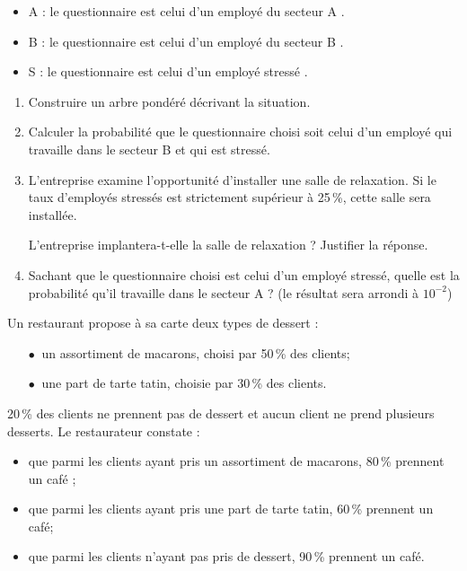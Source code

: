 \documentclass[a4paper,11pt]{article}
\begin{document}
\begin{itemize}
	\item A : \og le questionnaire est celui d'un employé du secteur A \fg. 
	\item B : \og le questionnaire est celui d'un employé du secteur B \fg. 
	\item S : \og le questionnaire est celui d'un employé stressé \fg.
\end{itemize}
 
\begin{enumerate}
	\item Construire un arbre pondéré décrivant la situation. 
	\item Calculer la probabilité que le questionnaire choisi soit celui d'un employé qui travaille dans le secteur B et qui est stressé. 
	\item L'entreprise examine l'opportunité d'installer une salle de relaxation. Si le taux d'employés stressés est strictement supérieur à 25\,\%, cette salle sera installée.
	 
	L'entreprise implantera-t-elle la salle de relaxation ? Justifier la réponse. 
	\item Sachant que le questionnaire choisi est celui d'un employé stressé, quelle est la probabilité qu'il travaille dans le secteur A ? (le résultat sera arrondi à $10^{-2}$)
\end{enumerate} 

\medskip

\exonum{}

\medskip

Un restaurant propose à sa carte deux types de dessert :

\begin{itemize}
	\item[$\bullet~$] un assortiment de macarons, choisi par 50\,\% des clients; 
	\item[$\bullet~$] une part de tarte tatin, choisie par 30\,\% des clients.
\end{itemize}
 
20\,\% des clients ne prennent pas de dessert et aucun client ne prend plusieurs desserts. Le restaurateur constate :

\begin{itemize}
	\item que parmi les clients ayant pris un assortiment de macarons, 80\,\% prennent un café ; 
	\item que parmi les clients ayant pris une part de tarte tatin, 60\,\% prennent un café; 
	\item que parmi les clients n'ayant pas pris de dessert, 90\,\% prennent un café.
\end{itemize}
\end{document}
